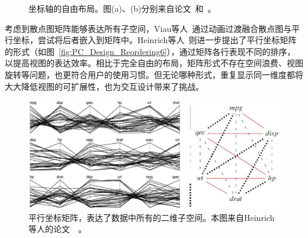 \documentclass[12pt,twocolumn]{article}
\begin{document}
\begin{figure}[!htb]
\centering
{}
\caption{坐标轴的自由布局。图(a)、(b)分别来自论文~\citep{lind2009many}和~\citep{claessen2011flexible}。}
\end{figure}

考虑到散点图矩阵能够表达所有子空间，Viau等人~\citep{viau2010flowvizmenu}通过动画过渡融合散点图与平行坐标，尝试将后者嵌入到矩阵中。Heinrich等人~\citep{heinrich2012parallel}则进一步提出了平行坐标矩阵的形式（如图~\ref{fig:PC_Design_Reordering6}），通过矩阵各行表现不同的排序，以提高视图的表达效率。相比于完全自由的布局，矩阵形式不存在空间浪费、视图旋转等问题，也更符合用户的使用习惯。但无论哪种形式，重复显示同一维度都将大大降低视图的可扩展性，也为交互设计带来了挑战。

\begin{figure}[!htb]
\centering
\includegraphics[width=1.0\linewidth]{images/PC_Design_Reordering6.eps}
\caption{\label{fig:PC_Design_Reordering7}平行坐标矩阵，表达了数据中所有的二维子空间。本图来自Heinrich等人的论文~\citep{heinrich2012parallel}~。
}
\end{figure}
\end{document}
